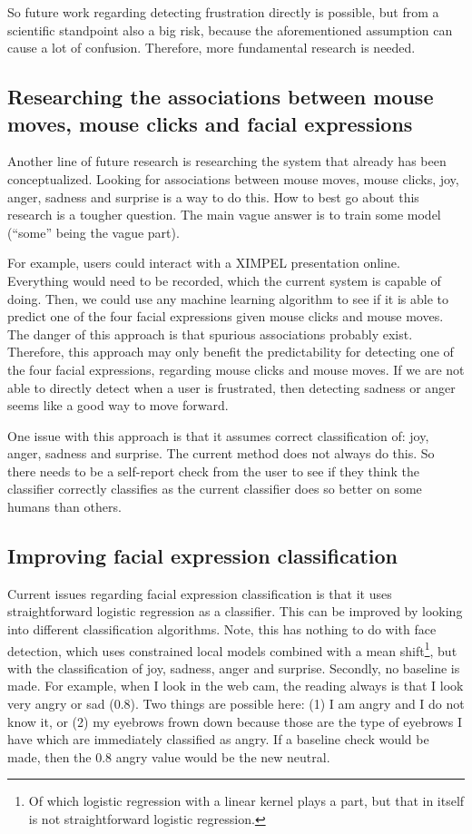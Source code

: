 So future work regarding detecting frustration directly is possible, but from a scientific standpoint also a big risk, because the aforementioned assumption can cause a lot of confusion. Therefore, more fundamental research is needed.

\subsection{Researching the associations between mouse moves, mouse clicks and facial expressions}
Another line of future research is researching the system that already has been conceptualized. Looking for associations between mouse moves, mouse clicks, joy, anger, sadness and surprise is a way to do this. How to best go about this research is a tougher question. The main vague answer is to train some model (``some'' being the vague part).

For example, users could interact with a XIMPEL presentation online. Everything would need to be recorded, which the current system is capable of doing. Then, we could use any machine learning algorithm to see if it is able to predict one of the four facial expressions given mouse clicks and mouse moves. The danger of this approach is that spurious associations probably exist. Therefore, this approach may only benefit the predictability for detecting one of the four facial expressions, regarding mouse clicks and mouse moves. If we are not able to directly detect when a user is frustrated, then detecting sadness or anger seems like a good way to move forward.

One issue with this approach is that it assumes correct classification of: joy, anger, sadness and surprise. The current method does not always do this. So there needs to be a self-report check from the user to see if they think the classifier correctly classifies as the current classifier does so better on some humans than others.

\subsection{Improving facial expression classification}
Current issues regarding facial expression classification is that it uses straightforward logistic regression as a classifier. This can be improved by looking into different classification algorithms. Note, this has nothing to do with face detection, which uses constrained local models combined with a mean shift\footnote{Of which logistic regression with a linear kernel plays a part, but that in itself is not straightforward logistic regression.}, but with the classification of joy, sadness, anger and surprise. Secondly, no baseline is made. For example, when I look in the web cam, the reading always is that I look very angry or sad (0.8). Two things are possible here: (1) I am angry and I do not know it, or (2) my eyebrows frown down because those are the type of eyebrows I have which are immediately classified as angry. If a baseline check would be made, then the 0.8 angry value would be the new neutral. 